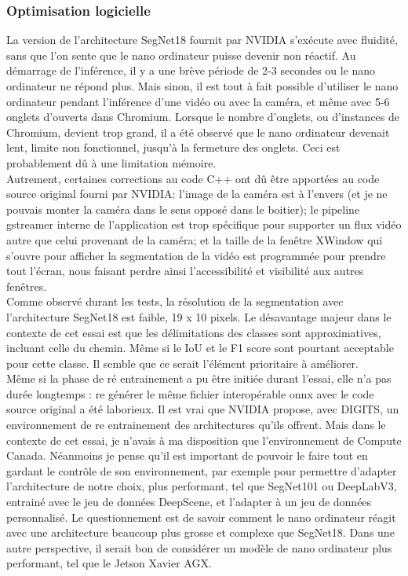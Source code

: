 \subsubsection{Optimisation logicielle}
\noindent La version de l'architecture SegNet18 fournit par NVIDIA s'exécute avec fluidité, sans que l'on sente que le nano ordinateur puisse devenir non réactif. Au démarrage de l'inférence, il y a une brève période de 2-3 secondes ou le nano ordinateur ne répond plus. Mais sinon, il est tout à fait possible d'utiliser le nano ordinateur pendant l'inférence d'une vidéo ou avec la caméra, et même avec 5-6 onglets d'ouverts dans Chromium. Lorsque le nombre d'onglets, ou d'instances de Chromium, devient trop grand, il a été observé que le nano ordinateur devenait lent, limite non fonctionnel, jusqu'à la fermeture des onglets. Ceci est probablement dû à une limitation mémoire.
\vspace{\baselineskip}
\\
\noindent Autrement, certaines corrections au code C++ ont dû être apportées au code source original fourni par NVIDIA: l'image de la caméra est à l'envers (et je ne pouvais monter la caméra dans le sens opposé dans le boitier); le pipeline gstreamer interne de l'application est trop spécifique pour supporter un flux vidéo autre que celui provenant de la caméra; et la taille de la fenêtre XWindow qui s'ouvre pour afficher la segmentation de la vidéo est programmée pour prendre tout l'écran, nous faisant perdre ainsi l'accessibilité et visibilité aux autres fenêtres.
\vspace{\baselineskip}
\\
\noindent Comme observé durant les tests, la résolution de la segmentation avec l'architecture SegNet18 est faible, 19 x 10 pixels. Le désavantage majeur dans le contexte de cet essai est que les délimitations des classes sont approximatives, incluant celle du chemin. Même si le IoU et le F1 score sont pourtant acceptable pour cette classe. Il semble que ce serait l'élément prioritaire à améliorer. 
\vspace{\baselineskip}
\\
\noindent Même si la phase de ré entrainement a pu être initiée durant l'essai, elle n'a pas durée longtemps : re générer le même fichier interopérable \acrshort{onnx} avec le code source original a été laborieux. Il est vrai que NVIDIA propose, avec DIGITS, un environnement de re entrainement des architectures qu'ils offrent. Mais dans le contexte de cet essai, je n'avais à ma disposition que l'environnement de Compute Canada. Néanmoins je pense qu'il est important de pouvoir le faire tout en gardant le contrôle de son environnement, par exemple pour permettre d'adapter l'architecture de notre choix, plus performant, tel que SegNet101 ou DeepLabV3, entrainé avec le jeu de données DeepScene, et l'adapter à un jeu de données personnalisé. Le questionnement est de savoir comment le nano ordinateur réagit avec une architecture beaucoup plus grosse et complexe que SegNet18. Dans une autre perspective, il serait bon de considérer un modèle de nano ordinateur plus performant, tel que le Jetson Xavier AGX.
